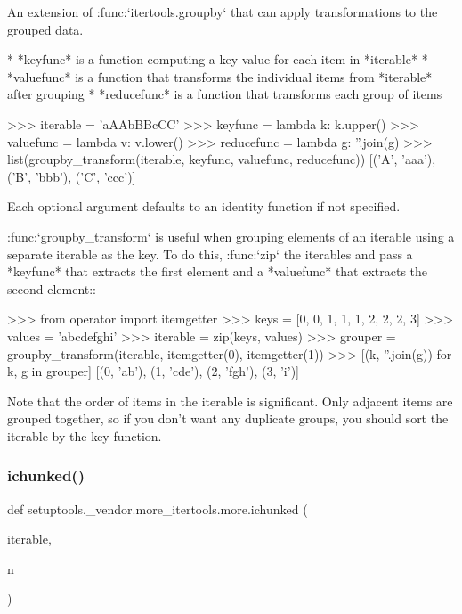 \begin{DoxyVerb}An extension of :func:`itertools.groupby` that can apply transformations
to the grouped data.

* *keyfunc* is a function computing a key value for each item in *iterable*
* *valuefunc* is a function that transforms the individual items from
  *iterable* after grouping
* *reducefunc* is a function that transforms each group of items

>>> iterable = 'aAAbBBcCC'
>>> keyfunc = lambda k: k.upper()
>>> valuefunc = lambda v: v.lower()
>>> reducefunc = lambda g: ''.join(g)
>>> list(groupby_transform(iterable, keyfunc, valuefunc, reducefunc))
[('A', 'aaa'), ('B', 'bbb'), ('C', 'ccc')]

Each optional argument defaults to an identity function if not specified.

:func:`groupby_transform` is useful when grouping elements of an iterable
using a separate iterable as the key. To do this, :func:`zip` the iterables
and pass a *keyfunc* that extracts the first element and a *valuefunc*
that extracts the second element::

    >>> from operator import itemgetter
    >>> keys = [0, 0, 1, 1, 1, 2, 2, 2, 3]
    >>> values = 'abcdefghi'
    >>> iterable = zip(keys, values)
    >>> grouper = groupby_transform(iterable, itemgetter(0), itemgetter(1))
    >>> [(k, ''.join(g)) for k, g in grouper]
    [(0, 'ab'), (1, 'cde'), (2, 'fgh'), (3, 'i')]

Note that the order of items in the iterable is significant.
Only adjacent items are grouped together, so if you don't want any
duplicate groups, you should sort the iterable by the key function.\end{DoxyVerb}
 \mbox{\label{namespacesetuptools_1_1__vendor_1_1more__itertools_1_1more_a1bf1536200cc78d82b5aa239e89f8770}} 
\subsubsection{\texorpdfstring{ichunked()}{ichunked()}}
{\footnotesize\ttfamily def setuptools.\+\_\+vendor.\+more\+\_\+itertools.\+more.\+ichunked (\begin{DoxyParamCaption}\item[{}]{iterable,  }\item[{}]{n }\end{DoxyParamCaption})}

